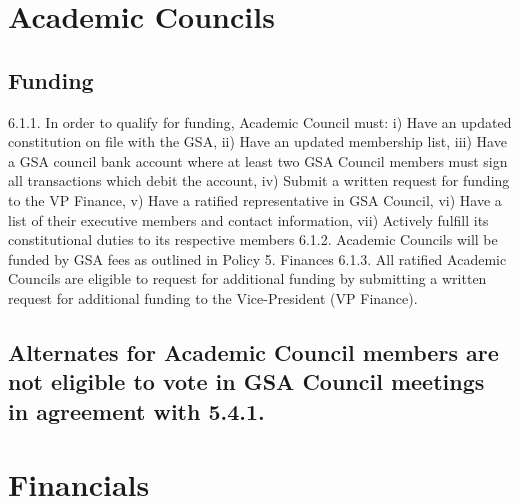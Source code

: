 \documentclass{article}
\begin{document}
\section{Academic Councils }
\subsection{Funding }
6.1.1. In order to qualify for funding, Academic Council must: 
i) Have an updated constitution on file with the GSA, 
ii) Have an updated membership list, 
iii) Have a GSA council bank account where at least two GSA Council 
members must sign all transactions which debit the account, 
iv) Submit a written request for funding to the VP Finance, 
v) Have a ratified representative in GSA Council, 
vi) Have a list of their executive members and contact information, 
vii) Actively fulfill its constitutional duties to its respective members 
6.1.2. Academic Councils will be funded by GSA fees as outlined in Policy 5. Finances 
6.1.3. All ratified Academic Councils are eligible to request for additional 
funding by submitting a written request for additional funding to the 
Vice-President (VP Finance). 
\subsection{Alternates for Academic Council members are not eligible to vote 
 in GSA Council meetings in agreement with 5.4.1. }
\section{Financials }
\end{document}
